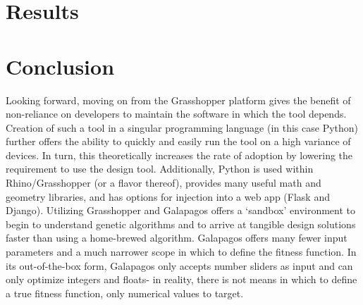 \documentclass[sagev,times,Royal]{sagej}
\begin{document}
\section{Results}

\section{Conclusion}
Looking forward, moving on from the Grasshopper platform gives the benefit of non-reliance on developers to maintain the software in which the tool depends. Creation of such a tool in a singular programming language (in this case Python) further offers the ability to quickly and easily run the tool on a high variance of devices. In turn, this theoretically increases the rate of adoption by lowering the requirement to use the design tool. Additionally, Python is used within Rhino/Grasshopper (or a flavor thereof), provides many useful math and geometry libraries, and has options for injection into a web app (Flask and Django).
Utilizing Grasshopper and Galapagos offers a ‘sandbox’ environment to begin to understand genetic algorithms and to arrive at tangible design solutions faster than using a home-brewed algorithm. Galapagos offers many fewer input parameters and a much narrower scope in which to define the fitness function. In its out-of-the-box form, Galapagos only accepts number sliders as input and can only optimize integers and floats- in reality, there is not means in which to define a true fitness function, only numerical values to target. 


%
%
\end{document}
